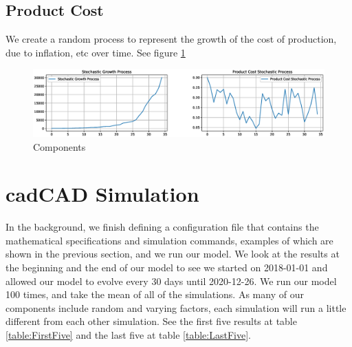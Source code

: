 \documentclass[12pt]{extarticle}
\begin{document}
\subsection{Product Cost}
We create a random process to represent the growth of the cost of production, due to inflation, etc over time. See figure \ref{fig:components}
\\
\begin{figure}[h]
    \centering
    \includegraphics[width=1\textwidth]{images/components.eps}
    \caption{Components}
    \label{fig:components}
\end{figure}

\section{cadCAD Simulation}
In the background, we finish defining a configuration file that contains the mathematical specifications and simulation commands, examples of which are shown in the previous section, and we run our model.
We look at the results at the beginning and the end of our model to see we started on 2018-01-01 and allowed our model to evolve every 30 days until 2020-12-26. We run our model 100 times, and take the mean of all of the simulations. As many of our components include random and varying factors, each simulation will run a little different from each other simulation. See the first five results at table \ref{table:FirstFive} and the last five at table \ref{table:LastFive}. \\ 
\end{document}
